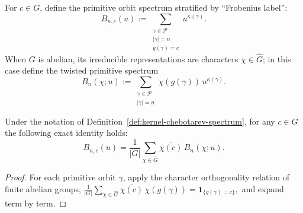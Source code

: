 \begin{definition}\label{def:kernel-chebotarev-spectrum}
For $c\in G$, define the primitive orbit spectrum stratified by ``Frobenius label'':
\[
B_{n,c}(u):=\sum_{\substack{\gamma\in\mathcal{P}\\|\gamma|=n\\g(\gamma)=c}}u^{\kappa(\gamma)}.
\]
When $G$ is abelian, its irreducible representations are characters $\chi\in\widehat G$; in this case define the twisted primitive spectrum
\[
B_n(\chi;u):=\sum_{\substack{\gamma\in\mathcal{P}\\|\gamma|=n}}\chi(g(\gamma))\,u^{\kappa(\gamma)}.
\]
\end{definition}

\begin{proposition}\label{prop:kernel-chebotarev-fourier}
Under the notation of Definition~\ref{def:kernel-chebotarev-spectrum}, for any $c\in G$ the following exact identity holds:
\[
B_{n,c}(u)=\frac{1}{|G|}\sum_{\chi\in\widehat G}\overline{\chi(c)}\,B_n(\chi;u).
\]
\end{proposition}

\begin{proof}
For each primitive orbit $\gamma$, apply the character orthogonality relation of finite abelian groups,
\(
\frac{1}{|G|}\sum_{\chi\in\widehat G}\overline{\chi(c)}\,\chi(g(\gamma))=\mathbf{1}_{\{g(\gamma)=c\}},
\)
and expand term by term.
\end{proof}

